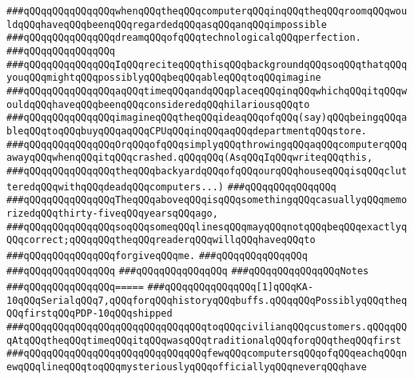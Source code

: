 \verb|###qQQqqQQqqQQqqQQqwhenqQQqtheqQQqcomputerqQQqinqQQqtheqQQqroomqQQqwouldqQQqhaveqQQqbeenqQQqregardedqQQqasqQQqanqQQqimpossible|\newline
\verb|###qQQqqQQqqQQqqQQqdreamqQQqofqQQqtechnologicalqQQqperfection.|\newline
\verb|###qQQqqQQqqQQqqQQq|\newline
\verb|###qQQqqQQqqQQqqQQqIqQQqreciteqQQqthisqQQqbackgroundqQQqsoqQQqthatqQQqyouqQQqmightqQQqpossiblyqQQqbeqQQqableqQQqtoqQQqimagine|\newline
\verb|###qQQqqQQqqQQqqQQqaqQQqtimeqQQqandqQQqplaceqQQqinqQQqwhichqQQqitqQQqwouldqQQqhaveqQQqbeenqQQqconsideredqQQqhilariousqQQqto|\newline
\verb|###qQQqqQQqqQQqqQQqimagineqQQqtheqQQqideaqQQqofqQQq(say)qQQqbeingqQQqableqQQqtoqQQqbuyqQQqaqQQqCPUqQQqinqQQqaqQQqdepartmentqQQqstore.|\newline
\verb|###qQQqqQQqqQQqqQQqOrqQQqofqQQqsimplyqQQqthrowingqQQqaqQQqcomputerqQQqawayqQQqwhenqQQqitqQQqcrashed.qQQqqQQq(AsqQQqIqQQqwriteqQQqthis,|\newline
\verb|###qQQqqQQqqQQqqQQqtheqQQqbackyardqQQqofqQQqourqQQqhouseqQQqisqQQqclutteredqQQqwithqQQqdeadqQQqcomputers...)|\newline
\verb|###qQQqqQQqqQQqqQQq|\newline
\verb|###qQQqqQQqqQQqqQQqTheqQQqaboveqQQqisqQQqsomethingqQQqcasuallyqQQqmemorizedqQQqthirty-fiveqQQqyearsqQQqago,|\newline
\verb|###qQQqqQQqqQQqqQQqsoqQQqsomeqQQqlinesqQQqmayqQQqnotqQQqbeqQQqexactlyqQQqcorrect;qQQqqQQqtheqQQqreaderqQQqwillqQQqhaveqQQqto|\newline
\verb|###qQQqqQQqqQQqqQQqforgiveqQQqme.|\newline
\verb|###qQQqqQQqqQQqqQQq|\newline
\verb|###qQQqqQQqqQQqqQQq|\newline
\verb|###qQQqqQQqqQQqqQQq|\newline
\verb|###qQQqqQQqqQQqqQQqNotes|\newline
\verb|###qQQqqQQqqQQqqQQq=====|\newline
\verb|###qQQqqQQqqQQqqQQq[1]qQQqKA-10qQQqSerialqQQq7,qQQqforqQQqhistoryqQQqbuffs.qQQqqQQqPossiblyqQQqtheqQQqfirstqQQqPDP-10qQQqshipped|\newline
\verb|###qQQqqQQqqQQqqQQqqQQqqQQqqQQqqQQqtoqQQqcivilianqQQqcustomers.qQQqqQQqAtqQQqtheqQQqtimeqQQqitqQQqwasqQQqtraditionalqQQqforqQQqtheqQQqfirst|\newline
\verb|###qQQqqQQqqQQqqQQqqQQqqQQqqQQqqQQqfewqQQqcomputersqQQqofqQQqeachqQQqnewqQQqlineqQQqtoqQQqmysteriouslyqQQqofficiallyqQQqneverqQQqhave|\newline
